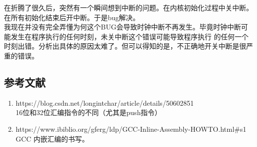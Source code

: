 \documentclass[a4paper]{article}
\begin{document}
    在折腾了很久后，突然有一个瞬间想到中断的问题。在内核初始化过程中关中断。在所有初始化结束后开中断。于是bug解决。\\ 

    我现在并没有完全弄懂为何这个BUG会导致时钟中断不再发生。毕竟时钟中断可能发生在程序执行的任何时刻，未关中断这个错误可能导致程序执行
    的任何一个时刻出错。分析出具体的原因太难了。但可以得知的是，不正确地开关中断是很严重的错误。
\begin{appendices}
\section{参考文献} \label{sec:reference}
\begin{enumerate}
    \item https://blog.csdn.net/longintchar/article/details/50602851 \\
    16位和32位汇编指令的不同（尤其是push指令）
    \item https://www.ibiblio.org/gferg/ldp/GCC-Inline-Assembly-HOWTO.html\#s1 \\
    GCC 内嵌汇编的书写。
  \end{enumerate}
\end{appendices}
\end{document}

